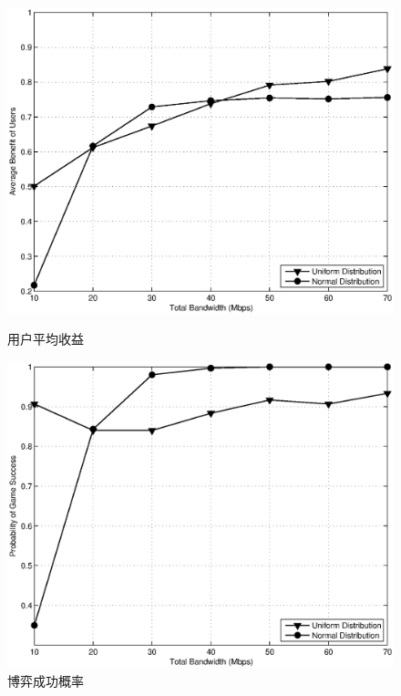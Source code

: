 \begin{figure}[!tb] 
    \centering
 \begin{minipage}[t]{0.6\linewidth} 
    \centering 
    \includegraphics[width = \textwidth]{bayesian_normal_bandwidth_vs_avg_benefit.eps} 
    \caption{用户平均收益} 
    \label{fig:chap_bayesian:normal_bandwidth_vs_avg_benefit} 
  \end{minipage}%

  \begin{minipage}[t]{0.6\linewidth} 
    \centering 
    \includegraphics[width=\textwidth]{bayesian_normal_bandwidth_vs_success_probability.eps} 
    \caption{博弈成功概率} 
    \label{fig:chap_bayesian:normal_bandwidth_vs_success_probability} 
  \end{minipage} 
\end{figure}

